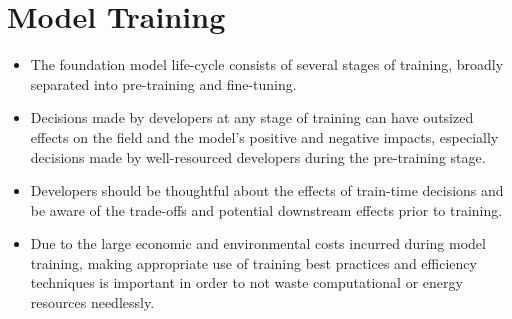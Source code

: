 \section{Model Training}
\label{sec:model-training}
\vspace{-2mm}

\begin{tcolorbox}[
    width=\textwidth,
    title={Model Training Best Practices},
    colback=backgroundcol, %
    colframe=darkgray, %
    colbacktitle=modeltraining, %
    coltitle=white, %
    coltext=black %
]

\begin{itemize}[itemsep=0pt, wide=3pt] 
    \item The foundation model life-cycle consists of several stages of training, broadly separated into pre-training and fine-tuning. 
    \item Decisions made by developers at any stage of training can have outsized effects on the field and the model's positive and negative impacts, especially decisions made by well-resourced developers during the pre-training stage.
    \item Developers should be thoughtful about the effects of train-time decisions and be aware of the trade-offs and potential downstream effects prior to training.
    \item Due to the large economic and environmental costs incurred during model training, making appropriate use of training best practices and efficiency techniques is important in order to not waste computational or energy resources needlessly.
\end{itemize}
\end{tcolorbox}



